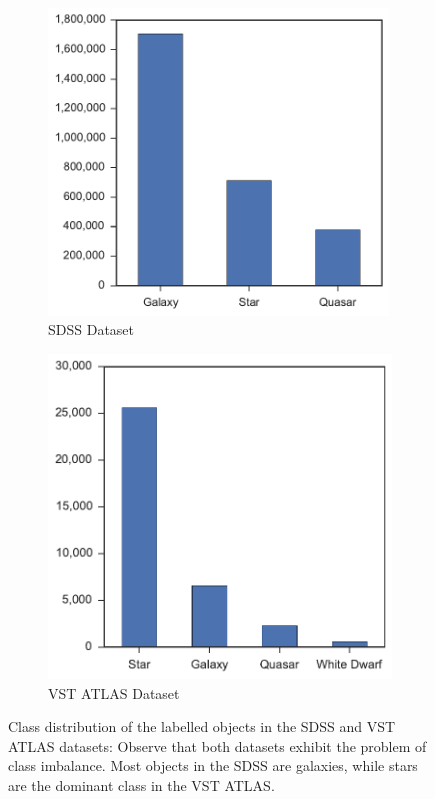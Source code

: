 \begin{figure}[tbp]
	\centering
	\begin{subfigure}{.5\textwidth}
		\centering
		\includegraphics[width=0.99\textwidth]{figures/2_astro/sdss_class_distribution}
		\caption{SDSS Dataset}
		\label{fig:class_dist_sdss}
	\end{subfigure}%
	\begin{subfigure}{.5\textwidth}
		\centering
		\includegraphics[width=0.99\linewidth]{figures/2_astro/vstatlas_class_distribution}
		\caption{VST ATLAS Dataset}
		\label{fig:class_dist_vst}
	\end{subfigure}
	\caption[Distribution of the classes in the SDSS and VST ATLAS datasets]{
		Class distribution of the labelled objects in the SDSS and VST ATLAS datasets: Observe
		that both datasets exhibit the problem of class imbalance. Most objects in the
		SDSS are galaxies, while stars are the dominant class in the VST ATLAS.}
	\label{fig:class_dist}
\end{figure}


